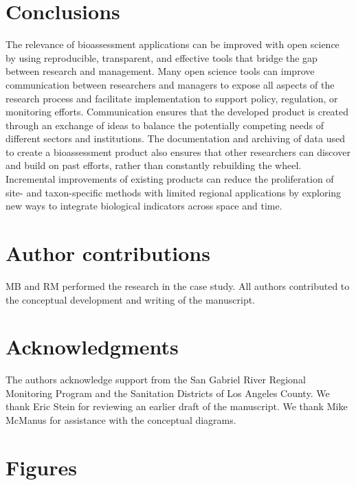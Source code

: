 \documentclass[fleqn,10pt,lineno]{wlpeerj} %
\begin{document}
\hypertarget{conclusions}{%
\section{Conclusions}\label{conclusions}}

The relevance of bioassessment applications can be improved with open science by using reproducible, transparent, and effective tools that bridge the gap between research and management. Many open science tools can improve communication between researchers and managers to expose all aspects of the research process and facilitate implementation to support policy, regulation, or monitoring efforts. Communication ensures that the developed product is created through an exchange of ideas to balance the potentially competing needs of different sectors and institutions. The documentation and archiving of data used to create a bioassessment product also ensures that other researchers can discover and build on past efforts, rather than constantly rebuilding the wheel. Incremental improvements of existing products can reduce the proliferation of site- and taxon-specific methods with limited regional applications by exploring new ways to integrate biological indicators across space and time.

\hypertarget{author-contributions}{%
\section{Author contributions}\label{author-contributions}}

MB and RM performed the research in the case study. All authors contributed to the conceptual development and writing of the manuscript.

\hypertarget{acknowledgments}{%
\section{Acknowledgments}\label{acknowledgments}}

The authors acknowledge support from the San Gabriel River Regional Monitoring Program and the Sanitation Districts of Los Angeles County. We thank Eric Stein for reviewing an earlier draft of the manuscript. We thank Mike McManus for assistance with the conceptual diagrams.

\hypertarget{figures}{%
\section{Figures}\label{figures}}
\end{document}
